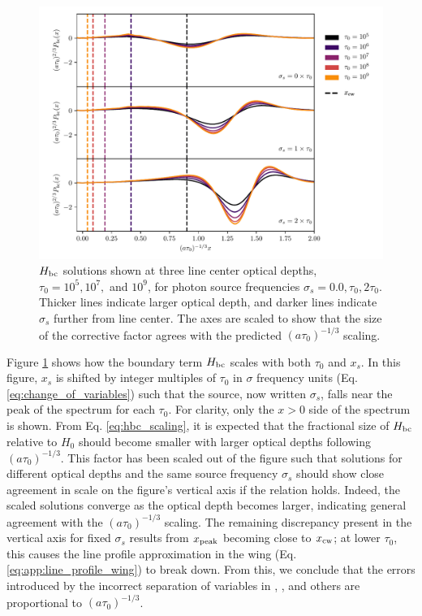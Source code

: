 \documentclass{aastex63}
\begin{document}
\begin{figure}
    \centering
    \includegraphics[width=\textwidth]{xinit.pdf}
    \caption{$H_{\rm bc}$ solutions shown at three line center optical depths, $\tau_0=10^5, 10^7,$ and $10^9$, for photon source frequencies $\sigma_s=0.0, \tau_0, 2\tau_0$. Thicker lines indicate larger optical depth, and darker lines indicate $\sigma_s$ further from line center. The axes are scaled to show that the size of the corrective factor agrees with the predicted $(a\tau_0)^{-1/3}$ scaling.}
    \label{fig:xinit}
\end{figure}

Figure \ref{fig:xinit} shows how the boundary term $H_{\rm bc}$ scales with both $\tau_0$ and $x_s$. In this figure, $x_s$ is shifted by integer multiples of $\tau_0$ in $\sigma$ frequency units (Eq. \ref{eq:change_of_variables}) such that the source, now written $\sigma_s$, falls near the peak of the spectrum for each $\tau_0$. For clarity, only the $x > 0$ side of the spectrum is shown. From Eq. \ref{eq:hbc_scaling}, it is expected that the fractional size of $H_{\rm bc}$ relative to $H_0$ should become smaller with larger optical depths following $(a\tau_0)^{-1/3}$. This factor has been scaled out of the figure such that solutions for different optical depths and the same source frequency $\sigma_s$ should show close agreement in scale on the figure's vertical axis if the relation holds. Indeed, the scaled solutions converge as the optical depth becomes larger, indicating general agreement with the $(a\tau_0)^{-1/3}$ scaling. The remaining discrepancy present in the vertical axis for fixed $\sigma_s$ results from $x_{\rm peak}$ becoming close to $x_{\rm cw}$; at lower $\tau_0$, this causes the line profile approximation in the wing (Eq. \ref{eq:app:line_profile_wing}) to break down. From this, we conclude that the errors introduced by the incorrect separation of variables in \cite{1973MNRAS.162...43H}, \cite{1990ApJ...350..216N}, \cite{2006ApJ...649...14D} and others are proportional to $(a\tau_0)^{-1/3}$.
\end{document}
